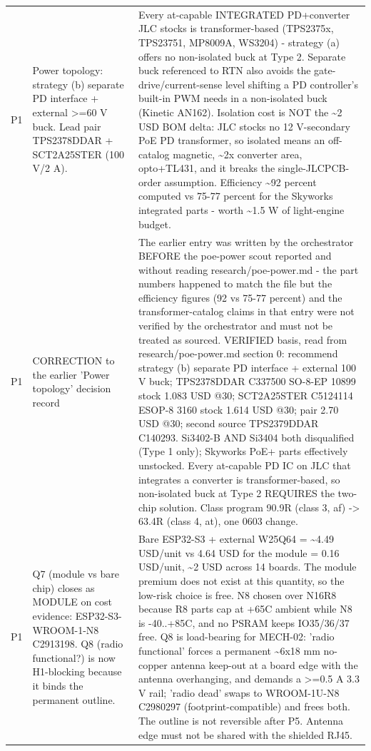 \documentclass[11pt,a4paper]{article}
\begin{document}
{\begin{longtable}{lp{5.2cm}p{7.2cm}}
P1 & Power topology: strategy (b) separate PD interface + external \textgreater{}=60 V buck. Lead pair TPS2378DDAR + SCT2A25STER (100 V/2 A). & Every at-capable INTEGRATED PD+converter JLC stocks is transformer-based (TPS2375x, TPS23751, MP8009A, WS3204) - strategy (a) offers no non-isolated buck at Type 2. Separate buck referenced to RTN also avoids the gate-drive/current-sense level shifting a PD controller's built-in PWM needs in a non-isolated buck (Kinetic AN162). Isolation cost is NOT the \textasciitilde{}2 USD BOM delta: JLC stocks no 12 V-secondary PoE PD transformer, so isolated means an off-catalog magnetic, \textasciitilde{}2x converter area, opto+TL431, and it breaks the single-JLCPCB-order assumption. Efficiency \textasciitilde{}92 percent computed vs 75-77 percent for the Skyworks integrated parts - worth \textasciitilde{}1.5 W of light-engine budget. \\
P1 & CORRECTION to the earlier 'Power topology' decision record & The earlier entry was written by the orchestrator BEFORE the poe-power scout reported and without reading research/poe-power.md - the part numbers happened to match the file but the efficiency figures (92 vs 75-77 percent) and the transformer-catalog claims in that entry were not verified by the orchestrator and must not be treated as sourced. VERIFIED basis, read from research/poe-power.md section 0: recommend strategy (b) separate PD interface + external 100 V buck; TPS2378DDAR C337500 SO-8-EP 10899 stock 1.083 USD @30; SCT2A25STER C5124114 ESOP-8 3160 stock 1.614 USD @30; pair 2.70 USD @30; second source TPS2379DDAR C140293. Si3402-B AND Si3404 both disqualified (Type 1 only); Skyworks PoE+ parts effectively unstocked. Every at-capable PD IC on JLC that integrates a converter is transformer-based, so non-isolated buck at Type 2 REQUIRES the two-chip solution. Class program 90.9R (class 3, af) -\textgreater{} 63.4R (class 4, at), one 0603 change. \\
P1 & Q7 (module vs bare chip) closes as MODULE on cost evidence: ESP32-S3-WROOM-1-N8 C2913198. Q8 (radio functional?) is now H1-blocking because it binds the permanent outline. & Bare ESP32-S3 + external W25Q64 = \textasciitilde{}4.49 USD/unit vs 4.64 USD for the module = 0.16 USD/unit, \textasciitilde{}2 USD across 14 boards. The module premium does not exist at this quantity, so the low-risk choice is free. N8 chosen over N16R8 because R8 parts cap at +65C ambient while N8 is -40..+85C, and no PSRAM keeps IO35/36/37 free. Q8 is load-bearing for MECH-02: 'radio functional' forces a permanent \textasciitilde{}6x18 mm no-copper antenna keep-out at a board edge with the antenna overhanging, and demands a \textgreater{}=0.5 A 3.3 V rail; 'radio dead' swaps to WROOM-1U-N8 C2980297 (footprint-compatible) and frees both. The outline is not reversible after P5. Antenna edge must not be shared with the shielded RJ45. \\

\end{longtable}}
\end{document}
